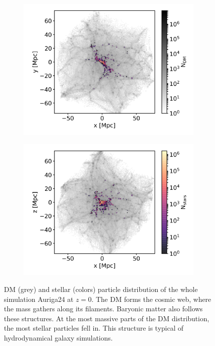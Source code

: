 \begin{figure}[htbp]
\captionsetup{format=plain}
    \centering
    \begin{subfigure}[b]{0.8\textwidth}
	    \includegraphics[width=\textwidth]{plots/Auriga/DM_and_stars_xy_distribution.png}
	    \label{fig:DM_stars_xy}
    \end{subfigure}
    
    \begin{subfigure}[b]{0.8\textwidth}
    \centering
    	\includegraphics[width=\textwidth]{plots/Auriga/DM_and_stars_xz_distribution.png}
    	\label{fig:DM_stars_xy}
    \end{subfigure}
    \caption{\ac{DM} (grey) and stellar (colors) particle distribution of the whole simulation Auriga24 at $\textit{z}=0$. The \ac{DM} forms the cosmic web, where the mass gathers along its filaments. Baryonic matter also follows these structures. At the most massive parts of the \ac{DM} distribution, the most stellar particles fell in. This structure is typical of hydrodynamical galaxy simulations.}\label{fig:DM_stars_AU24}
\end{figure}
